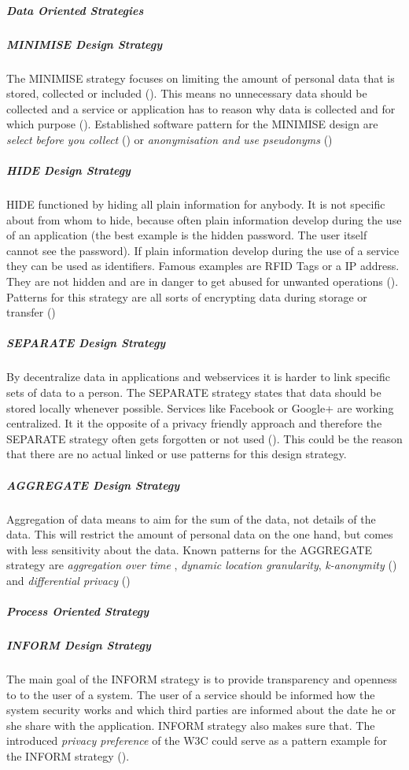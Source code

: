 \subparagraph{Data Oriented Strategies}

\subparagraph{MINIMISE Design Strategy}
The MINIMISE strategy focuses on limiting the amount of personal data that is stored, collected or included (\cite{domingo1997multi}). This means no unnecessary data should be collected and a service or application has to reason why data is collected and for which purpose (\cite{graf2010pattern}). Established software pattern for the MINIMISE design are \textit{select before you collect} (\cite{jacobs2005select}) or \textit{anonymisation and use pseudonyms} (\cite{pfitzmann2008anonymity})


\subparagraph{HIDE Design Strategy}
HIDE functioned by hiding all plain information for anybody. It is not specific about from whom to hide, because often plain information develop during the use of an application (the best example is the hidden password. The user itself cannot see the password). If plain information develop during the use of a service they can be used as identifiers. Famous examples are RFID Tags or a IP address. They are not hidden and are in danger to get abused for unwanted operations (\cite{domingo1997multi}). Patterns for this strategy are all sorts of encrypting data during storage or transfer (\cite{chaum1981untraceable})


\subparagraph{SEPARATE Design Strategy}
By decentralize data in applications and webservices it is harder to link specific sets of data to a person. The SEPARATE strategy states that data should be stored locally whenever possible. Services like Facebook or Google+ are working centralized. It it the opposite of a privacy friendly approach and therefore the SEPARATE strategy often gets forgotten or not used (\cite{danezis2015privacy}).
This could be the reason that there are no actual linked or use patterns for this design strategy. 

\subparagraph{AGGREGATE Design Strategy}
Aggregation of data means to aim for the sum of the data, not details of the data. This will restrict the amount of personal data on the one hand, but comes with less sensitivity about the data. Known patterns for the AGGREGATE strategy are \textit{aggregation over time }, \textit{dynamic location granularity}, \textit{k-anonymity} (\cite{sweeney2002k}) and \textit{differential privacy} (\cite{fahl2013rethinking})


\subparagraph{Process Oriented Strategy}

\subparagraph{INFORM Design Strategy}
The main goal of the INFORM strategy is to provide transparency and openness to to the user of a system. The user of a service should be informed how the system security works and which third parties are informed about the date he or she share with the application. INFORM strategy also makes sure that. The introduced \textit{privacy preference} of the W3C could serve as a pattern example for the INFORM strategy (\cite{graf2010pattern}). 

